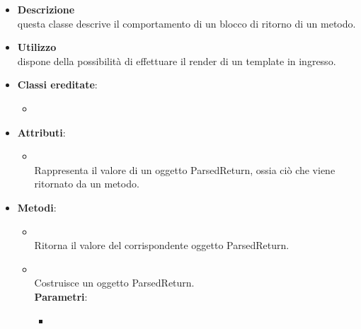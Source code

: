 \label{\nogloxy{swedesigner::server::project::ParsedReturn}}
\begin{figure}[h]
\centering
{}
\caption{}
\end{figure}
\FloatBarrier
\begin{itemize}
\item \textbf{Descrizione}\\
questa classe descrive il comportamento di un blocco di ritorno di un metodo.
\item \textbf{Utilizzo}\\
dispone della possibilità di effettuare il render di un template in ingresso.
\item \textbf{Classi ereditate}:
\begin{itemize}
\item \hyperref[\nogloxy{swedesigner::server::project::ParsedInstruction}]{}
\end{itemize}
\item \textbf{Attributi}:
\begin{itemize}
\item {}
\\ Rappresenta il valore di un oggetto ParsedReturn, ossia ciò che viene ritornato da un metodo.
\end{itemize}
\item \textbf{Metodi}:
\begin{itemize}
\item {}
\\ Ritorna il valore del corrispondente oggetto ParsedReturn.
\item {}
\\ Costruisce un oggetto ParsedReturn.
\\ \textbf{Parametri}:
\begin{itemize}
\item {}

\end{itemize}
\end{itemize}
\end{itemize}
